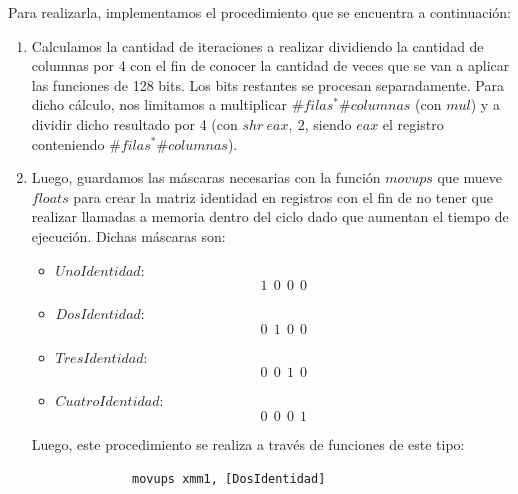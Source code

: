 \documentclass[10pt, a4paper]{article}
\begin{document}
Para realizarla, implementamos el procedimiento que se encuentra a continuación:
\begin{enumerate}
\item Calculamos la cantidad de iteraciones a realizar dividiendo la cantidad de columnas por 4 con el fin de conocer la cantidad de veces que se van a aplicar las funciones de 128 bits. Los bits restantes se procesan separadamente. Para dicho cálculo, nos limitamos a multiplicar $\#filas^*\#columnas$ (con $mul$) y a dividir dicho resultado por 4 (con $shr\ eax,\ 2$, siendo $eax$ el registro conteniendo $\#filas^*\#columnas$).
\item Luego, guardamos las máscaras necesarias con la función $movups$ que mueve $floats$ para crear la matriz identidad en registros con el fin de no tener que realizar llamadas a memoria dentro del ciclo dado que aumentan el tiempo de ejecución. Dichas máscaras son:
\begin{itemize}
\item $UnoIdentidad$: $$1\ \ 0\ \ 0 \ \ 0$$
\item $DosIdentidad$: $$0\ \ 1\ \ 0\ \ 0$$
\item $TresIdentidad$: $$0\ \ 0\ \ 1\ \ 0$$
\item $CuatroIdentidad$: $$0\ \ 0\ \ 0\ \ 1$$
\end{itemize}

Luego, este procedimiento se realiza a través de funciones de este tipo:

\begin{verbatim}
              movups xmm1, [DosIdentidad]
\end{verbatim}


\end{enumerate}
\end{document}
